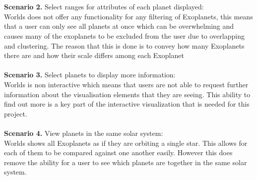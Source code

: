 \\\\
{\bf Scenario 2.} Select ranges for attributes of each planet displayed:\\
Worlds does not offer any functionality for any filtering of Exoplanets, this
means that a user can only see all planets at once which can be overwhelming and
causes many of the exoplanets to be excluded from the user due to overlapping
and clustering. The reason that this is done is to convey how many Exoplanets
there are and how their scale differs among each Exoplanet
\\\\
{\bf Scenario 3.} Select planets to display more information:\\
Worlds is non interactive which means that users are not able to request further
information about the visualisation elements that they are seeing. This ability
to find out more is a key part of the interactive visualization that is needed
for this project.
\\\\
{\bf Scenario 4.} View planets in the same solar system:\\
Worlds shows all Exoplanets as if they are orbiting a single star. This allows
for each of them to be compared against one another easily. However this does
remove the ability for a user to see which planets are together in the same
solar system.



